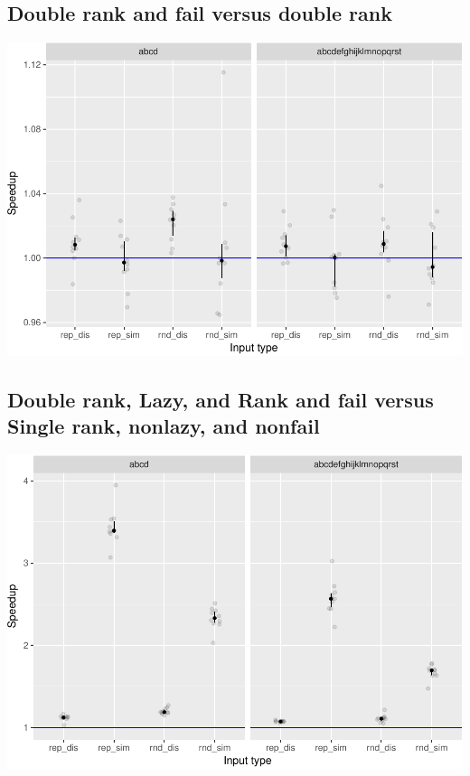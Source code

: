 \documentclass[]{article}
\begin{document}
\subsection{Double rank and fail versus double
rank}\label{double-rank-and-fail-versus-double-rank}

\includegraphics{sea_2018_files/figure-latex/fail_plot-1.pdf}

\subsection{Double rank, Lazy, and Rank and fail versus Single rank,
nonlazy, and
nonfail}\label{double-rank-lazy-and-rank-and-fail-versus-single-rank-nonlazy-and-nonfail}

\includegraphics{sea_2018_files/figure-latex/allflags_plot-1.pdf}
\end{document}
